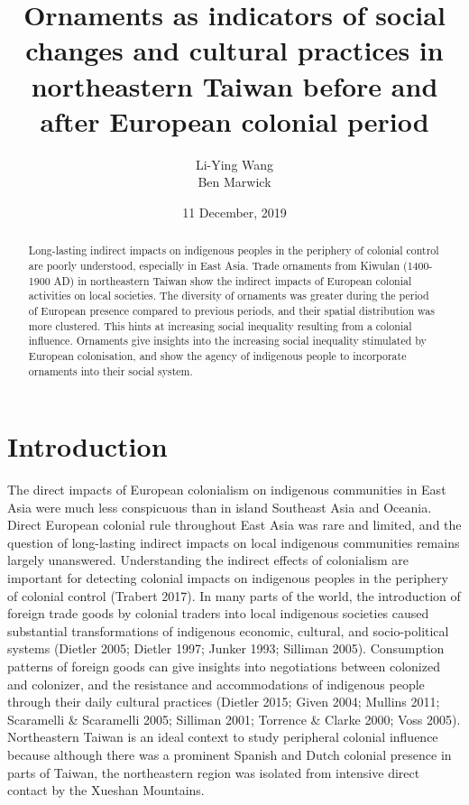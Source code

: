 \documentclass[]{article}
\title{Ornaments as indicators of social changes and cultural practices in
northeastern Taiwan before and after European colonial period}
\author{Li-Ying Wang \\ Ben Marwick}
\date{11 December, 2019}
\begin{document}
\maketitle
\begin{abstract}
Long-lasting indirect impacts on indigenous peoples in the periphery of
colonial control are poorly understood, especially in East Asia. Trade
ornaments from Kiwulan (1400-1900 AD) in northeastern Taiwan show the
indirect impacts of European colonial activities on local societies. The
diversity of ornaments was greater during the period of European
presence compared to previous periods, and their spatial distribution
was more clustered. This hints at increasing social inequality resulting
from a colonial influence. Ornaments give insights into the increasing
social inequality stimulated by European colonisation, and show the
agency of indigenous people to incorporate ornaments into their social
system.
\end{abstract}

\hypertarget{introduction}{%
\section{Introduction}\label{introduction}}

The direct impacts of European colonialism on indigenous communities in
East Asia were much less conspicuous than in island Southeast Asia and
Oceania. Direct European colonial rule throughout East Asia was rare and
limited, and the question of long-lasting indirect impacts on local
indigenous communities remains largely unanswered. Understanding the
indirect effects of colonialism are important for detecting colonial
impacts on indigenous peoples in the periphery of colonial control
(Trabert 2017). In many parts of the world, the introduction of foreign
trade goods by colonial traders into local indigenous societies caused
substantial transformations of indigenous economic, cultural, and
socio-political systems (Dietler 2005; Dietler 1997; Junker 1993;
Silliman 2005). Consumption patterns of foreign goods can give insights
into negotiations between colonized and colonizer, and the resistance
and accommodations of indigenous people through their daily cultural
practices (Dietler 2015; Given 2004; Mullins 2011; Scaramelli \&
Scaramelli 2005; Silliman 2001; Torrence \& Clarke 2000; Voss 2005).
Northeastern Taiwan is an ideal context to study peripheral colonial
influence because although there was a prominent Spanish and Dutch
colonial presence in parts of Taiwan, the northeastern region was
isolated from intensive direct contact by the Xueshan Mountains.
\end{document}

